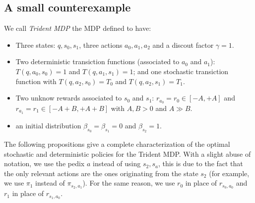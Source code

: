 \subsection{A small counterexample}

We call \textit{Trident MDP} the MDP defined to have:
\begin{itemize}
\item Three states: $q, s_0, s_1$, three actions $a_0, a_1, a_2$ and a discout factor $\gamma=1$.
\item Two deterministic transiction functions (associated to $a_0$ and $a_1$): $T(q,a_0,s_0)=1$ and $T(q,a_1,s_1)=1$; and one stochastic transiction function with $T(q,a_2,s_0)=T_0$ and $T(q,a_2,s_1)=T_1$. 	 
\item Two unknow rewards associated to $s_0$ and $s_1$: $r_{a_0}= r_0\in[-A,+A]$ and $r_{a_1}= r_1\in[-A+B,+A+B]$ with $A,B > 0$ and $A \gg B$.
\item an initial distribution $\beta_{s_0}= \beta_{s_1}=0$ and $\beta_{s_2}=1$.
\end{itemize} 



The following propositions give a complete characterization of the optimal stochastic and deterministic policies for the Trident MDP. With a slight abuse of notation, we use the pedix $a$ instead of using $s_2,s_a$, this is due to the fact that the only relevant actions are the ones originating from the state $s_2$ (for example, we use $\pi_1$ instead of $\pi_{s_2, a_1}$). For the same reason, we use $r_{0}$ in place of $r_{s_0, a_0}$ and $r_{1}$ in place of $r_{s_1, a_0}$.


